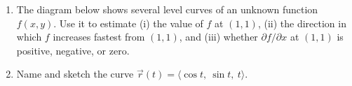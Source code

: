 \documentclass[12pt]{article}
\begin{document}
\begin{enumerate}
\begin{enumerate}
        \item The diagram below shows several level curves of an unknown function $f(x,y)$. Use it to estimate (i) the value of $f$ at $(1,1)$, (ii) the direction in which $f$ increases fastest from $(1,1)$, and (iii) whether $\partial f / \partial x$ at $(1,1)$ is positive, negative, or zero.
        \begin{center}
        \end{center}
        \item Name and sketch the curve $\vec r(t)=\langle \cos t,\ \sin t,\ t\rangle$.
    \end{enumerate}
\newpage


\end{enumerate}
\end{document}
